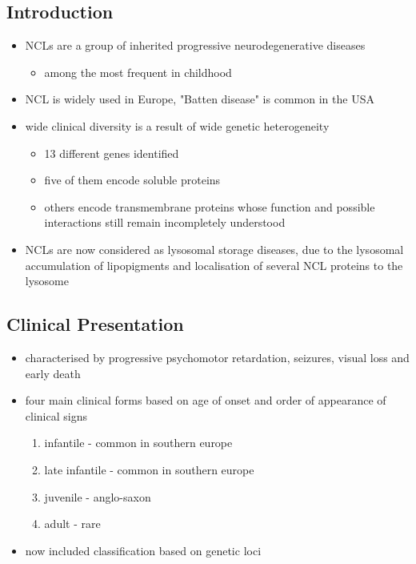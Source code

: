 \documentclass[12pt]{scrartcl}
\begin{document}
\subsection{Introduction}
\label{sec:org3592a64}
\begin{itemize}
\item NCLs are a group of inherited progressive neurodegenerative diseases
\begin{itemize}
\item among the most frequent in childhood
\end{itemize}
\item NCL is widely used in Europe, "Batten disease" is common in the USA
\item wide clinical diversity is a result of  wide genetic heterogeneity
\begin{itemize}
\item 13 different genes identified
\item five of them encode soluble proteins
\item others encode transmembrane proteins whose function and possible
interactions still remain incompletely understood
\end{itemize}
\item NCLs are now considered as lysosomal storage diseases, due to the
lysosomal accumulation of lipopigments and localisation of several
NCL proteins to the lysosome
\end{itemize}

\subsection{Clinical Presentation}
\label{sec:orgb98afad}
\begin{itemize}
\item characterised by progressive psychomotor retardation, seizures,
visual loss and early death
\item four main clinical forms based on age of onset and order of
appearance of clinical signs
\begin{enumerate}
\item infantile - common in southern europe
\item late infantile - common in southern europe
\item juvenile - anglo-saxon
\item adult - rare
\end{enumerate}
\item now included classification based on genetic loci
\end{itemize}
\end{document}
